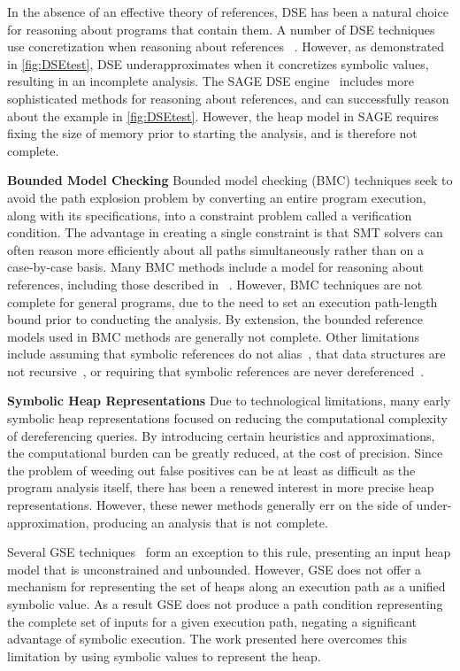 In the absence of an effective theory of references, DSE has been a natural choice for reasoning about programs that contain them. A number of DSE techniques use concretization when reasoning about references ~\cite{Godefroid:2005,Sen:2005,Godefroid:POPL07,Tillmann:2008}. However, as demonstrated in \ref{fig:DSEtest}, DSE underapproximates when it concretizes symbolic values, resulting in an incomplete analysis. The SAGE DSE engine~\cite{Elkarablieh:2009} includes more sophisticated methods for reasoning about references, and can successfully reason about the example in \ref{fig:DSEtest}. However, the heap model in SAGE requires fixing the size of memory prior to starting the analysis, and is therefore not complete. 

\noindent\textbf{Bounded Model Checking}
Bounded model checking (BMC) techniques seek to avoid the path explosion problem by converting an entire program execution, along with its specifications, into a constraint problem called a verification condition. The advantage in creating a single constraint is that SMT solvers can often reason more efficiently about all paths simultaneously rather than on a case-by-case basis. Many BMC methods include a model for reasoning about references, including those described in ~\cite{Clarke:2004,Barnett:2006,Xie:2005,Babic:2007,Dillig:2011}. However, BMC techniques are not complete for general programs, due to the need to set an execution path-length bound prior to conducting the analysis. By extension, the bounded reference models used in BMC methods are generally not complete. Other limitations include assuming that symbolic references do not alias~\cite{Xie:2005,Babic:2007}, that data structures are not recursive~\cite{Dillig:2011}, or requiring that symbolic references are never dereferenced~\cite{Clarke:2004}.

\noindent\textbf{Symbolic Heap Representations}
Due to technological limitations, many early symbolic heap representations focused on reducing the computational complexity of dereferencing queries. By introducing certain heuristics and approximations, the computational burden can be greatly reduced, at the cost of precision. Since the problem of weeding out false positives can be at least as difficult as the program analysis itself, there has been a renewed interest in more precise heap representations. However, these newer methods generally err on the side of under-approximation, producing an analysis that is not complete.

Several GSE techniques~\cite{GSE03,KiasanKunit} form an exception to this rule, presenting an input heap model that is unconstrained and unbounded. However, GSE does not offer a mechanism for representing the set of heaps along an execution path as a unified symbolic value. As a result GSE does not produce a path condition representing the complete set of inputs for a given execution path, negating a significant advantage of symbolic execution. The work presented here overcomes this limitation by using symbolic values to represent the heap.

